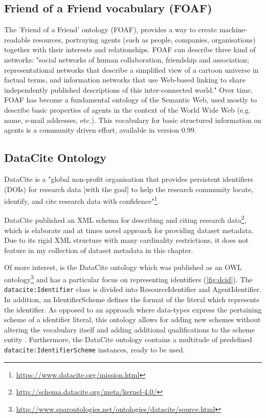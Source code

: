 \documentclass[a4paper,english,twoside,BCOR1.5cm,headsepline,DIV12,appendixprefix,final,12pt]{scrbook}
\newcommand{\prop}[1]{{{\texttt{#1}}}}
\newcommand\footnoteurl[1]{\footnote{\scriptsize\url{#1}}}
\begin{document}
\subsection{Friend of a Friend vocabulary (FOAF)}
\label{sec:foaf}
The 'Friend of a Friend' ontology (FOAF), provides a way to create machine-readable resources, portraying agents (such as people, companies, organisations) together with their interests and relationships. FOAF can describe three kind of networks: "social networks of human collaboration, friendship and association; representational networks that describe a simplified view of a cartoon universe in factual terms, and information networks that use Web-based linking to share independently published descriptions of this inter-connected world." \cite{Brickley-2014}
Over time, FOAF has become a fundamental ontology of the Semantic Web, used mostly to describe basic properties of agents in the context of the World Wide Web (e.g. name, e-mail addresses, etc.). This vocabulary for basic structured information on agents is a community driven effort, available in version 0.99.


\subsection{DataCite Ontology}
\label{sec:datacite}
DataCite is a "global non-profit organisation that provides persistent identifiers (DOIs) for research data [with the goal] to help the research community locate, identify, and cite research data with confidence"\footnoteurl{https://www.datacite.org/mission.html}. 

DataCite published an XML schema for describing and citing research data\footnoteurl{http://schema.datacite.org/meta/kernel-4.0/}, which is elaborate and at times novel approach for providing dataset metadata. Due to its rigid XML structure with many cardinality restrictions, it does not feature in my collection of dataset metadata in this chapter. 

Of more interest, is the DataCite ontology which was published as an OWL ontology\footnoteurl{http://www.sparontologies.net/ontologies/datacite/source.html} and has a particular focus on representing identifiers (\cref{fig:dcid}). The \prop{datacite:Identifier} class is divided into ResourceIdentifier and AgentIdentifier. In addition, an IdentifierScheme defines the format of the literal which represents the identifier. As opposed to an approach where data-types express the pertaining scheme of a identifier literal, this ontology allows for adding new schemes without altering the vocabulary itself and adding additional qualifications to the scheme entity \cite{Peroni2016}. Furthermore, the DataCite ontology contains a multitude of predefined \prop{datacite:IdentifierScheme} instances, ready to be used. 
\end{document}
